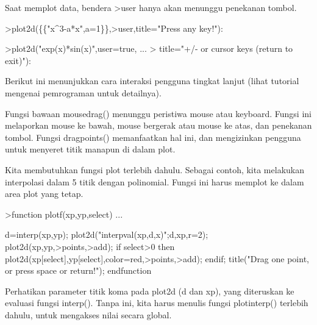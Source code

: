 \documentclass[12pt,arial,letterpaper]{book}
\begin{document}
\begin{eulernootebook}
\begin{eulercomment}
\begin{eulercomment}
\begin{eulernootebook}
\begin{eulercomment}
\begin{eulercomment}
\begin{eulercomment}
\begin{eulercomment}
\begin{eulercomment}
\begin{eulercomment}
\begin{eulercomment}
\begin{eulernotebook}
\begin{eulercomment}
\begin{eulercomment}
\begin{eulercomment}
\begin{eulercomment}
\begin{eulercomment}
Saat memplot data, bendera \textgreater{}user hanya akan menunggu penekanan tombol.
\end{eulercomment}
\begin{eulerprompt}
>plot2d(\{\{"x^3-a*x",a=1\}\},>user,title="Press any key!"):
\end{eulerprompt}
\begin{eulerprompt}
>plot2d("exp(x)*sin(x)",user=true, ...
>  title="+/- or cursor keys (return to exit)"):
\end{eulerprompt}
\begin{eulercomment}
Berikut ini menunjukkan cara interaksi pengguna tingkat lanjut (lihat
tutorial mengenai pemrograman untuk detailnya).

Fungsi bawaan mousedrag() menunggu peristiwa mouse atau keyboard.
Fungsi ini melaporkan mouse ke bawah, mouse bergerak atau mouse ke
atas, dan penekanan tombol. Fungsi dragpoints() memanfaatkan hal ini,
dan mengizinkan pengguna untuk menyeret titik manapun di dalam plot.

Kita membutuhkan fungsi plot terlebih dahulu. Sebagai contoh, kita
melakukan interpolasi dalam 5 titik dengan polinomial. Fungsi ini
harus memplot ke dalam area plot yang tetap.
\end{eulercomment}
\begin{eulerprompt}
>function plotf(xp,yp,select) ...
\end{eulerprompt}
\begin{eulerudf}
    d=interp(xp,yp);
    plot2d("interpval(xp,d,x)";d,xp,r=2);
    plot2d(xp,yp,>points,>add);
    if select>0 then
      plot2d(xp[select],yp[select],color=red,>points,>add);
    endif;
    title("Drag one point, or press space or return!");
  endfunction
\end{eulerudf}
\begin{eulercomment}
Perhatikan parameter titik koma pada plot2d (d dan xp), yang
diteruskan ke evaluasi fungsi interp(). Tanpa ini, kita harus menulis
fungsi plotinterp() terlebih dahulu, untuk mengakses nilai secara
global.


\end{eulercomment}
\end{eulercomment}
\end{eulercomment}
\end{eulercomment}
\end{eulercomment}
\end{eulernotebook}
\end{eulercomment}
\end{eulercomment}
\end{eulercomment}
\end{eulercomment}
\end{eulercomment}
\end{eulercomment}
\end{eulercomment}
\end{eulernootebook}
\end{eulercomment}
\end{eulercomment}
\end{eulernootebook}
\end{document}
